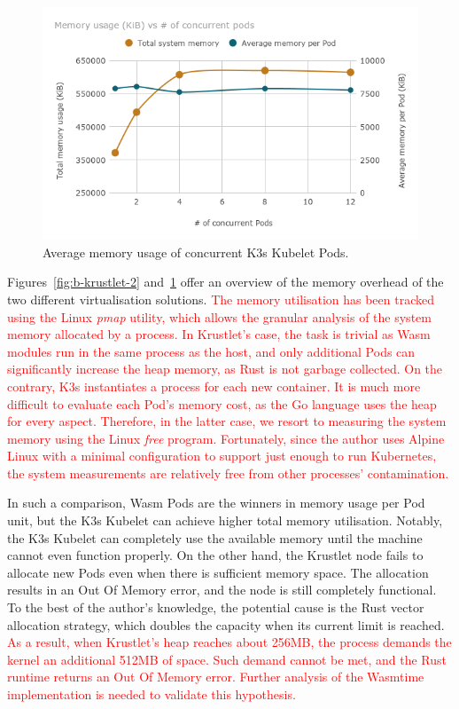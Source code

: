 \begin{figure}[ht]
\centering
\includegraphics[width=\columnwidth]{figures/b-krustlet-3}
\caption{Average memory usage of concurrent K3s Kubelet Pods.}
\label{fig:b-krustlet-3}
\end{figure}

Figures~\ref{fig:b-krustlet-2} and~\ref{fig:b-krustlet-3} offer an overview of the memory overhead of the two different virtualisation solutions. \textcolor{red}{The memory utilisation has been tracked using the Linux \emph{pmap} utility, which allows the granular analysis of the system memory allocated by a process. In Krustlet's case, the task is trivial as Wasm modules run in the same process as the host, and only additional Pods can significantly increase the heap memory, as Rust is not garbage collected. On the contrary, K3s instantiates a process for each new container. It is much more difficult to evaluate each Pod's memory cost, as the Go language uses the heap for every aspect. Therefore, in the latter case, we resort to measuring the system memory using the Linux \emph{free} program. Fortunately, since the author uses Alpine Linux with a minimal configuration to support just enough to run Kubernetes, the system measurements are relatively free from other processes' contamination.}

In such a comparison, Wasm Pods are the winners in memory usage per Pod unit, but the K3s Kubelet can achieve higher total memory utilisation. Notably, the K3s Kubelet can completely use the available memory until the machine cannot even function properly. On the other hand, the Krustlet node fails to allocate new Pods even when there is sufficient memory space. The allocation results in an Out Of Memory error, and the node is still completely functional. To the best of the author's knowledge, the potential cause is the Rust vector allocation strategy, which doubles the capacity when its current limit is reached. \textcolor{red}{As a result, when Krustlet's heap reaches about 256MB, the process demands the kernel an additional 512MB of space. Such demand cannot be met, and the Rust runtime returns an Out Of Memory error. Further analysis of the Wasmtime implementation is needed to validate this hypothesis.}

